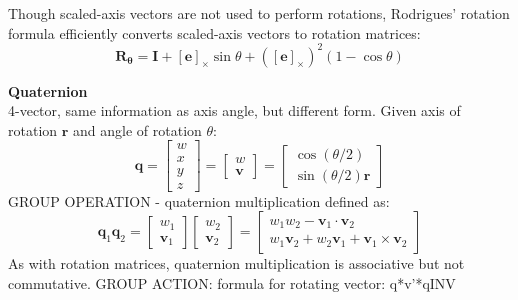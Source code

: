 		Though scaled-axis vectors are not used to perform rotations, Rodrigues' rotation formula efficiently converts scaled-axis vectors to rotation matrices:
		\begin{equation}
			\mathbf{R}_{\bm{\theta}} = \mathbf{I} + [\mathbf{e}]_{\times}\sin{\theta} + ([\mathbf{e}]_{\times})^2(1-\cos{\theta})
		\end{equation}
					
		\textbf{Quaternion}\\
		4-vector, same information as axis angle, but different form. Given axis of rotation $\mathbf{r}$ and angle of rotation $\theta$:
		\begin{equation}
			\mathbf{q} = 
			\begin{bmatrix}
				w \\
				x \\
				y \\
				z
			\end{bmatrix}
			 = 
			 \begin{bmatrix}
 				w \\
 				\mathbf{v}
			 \end{bmatrix}
			 =
			 \begin{bmatrix}
			 	\cos(\theta/2) \\
			 	\sin(\theta/2)\mathbf{r}
			 \end{bmatrix}
		\end{equation}
		GROUP OPERATION - quaternion multiplication defined as:
		\begin{equation}
			\mathbf{q}_1\mathbf{q}_2 =
			\begin{bmatrix}
			 	w_1 \\
			 	\mathbf{v}_1
			\end{bmatrix} 
			\begin{bmatrix}
			 	w_2 \\
			 	\mathbf{v}_2
			\end{bmatrix} 
			=
			\begin{bmatrix}
			 	w_1w_2 - \mathbf{v}_1 \cdot \mathbf{v}_2 \\
			 	w_1\mathbf{v}_2 + w_2\mathbf{v}_1 + \mathbf{v}_1 \times \mathbf{v}_2
			\end{bmatrix} 
		\end{equation} 
		As with rotation matrices, quaternion multiplication is associative but not commutative.
		GROUP ACTION: formula for rotating vector: q*v'*qINV
		
